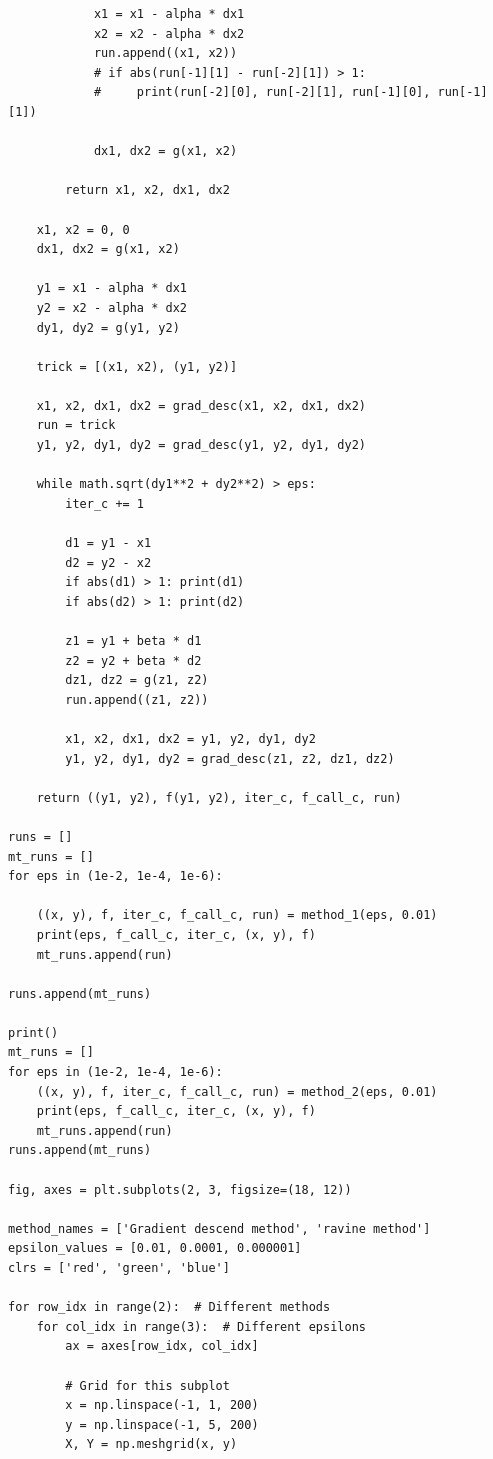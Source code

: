 \documentclass[12pt, letterpaper]{article}
\begin{document}
\begin{lstlisting}
            x1 = x1 - alpha * dx1
            x2 = x2 - alpha * dx2
            run.append((x1, x2))
            # if abs(run[-1][1] - run[-2][1]) > 1: 
            #     print(run[-2][0], run[-2][1], run[-1][0], run[-1][1]) 
            
            dx1, dx2 = g(x1, x2)

        return x1, x2, dx1, dx2

    x1, x2 = 0, 0
    dx1, dx2 = g(x1, x2)

    y1 = x1 - alpha * dx1
    y2 = x2 - alpha * dx2
    dy1, dy2 = g(y1, y2)

    trick = [(x1, x2), (y1, y2)]

    x1, x2, dx1, dx2 = grad_desc(x1, x2, dx1, dx2)
    run = trick
    y1, y2, dy1, dy2 = grad_desc(y1, y2, dy1, dy2)

    while math.sqrt(dy1**2 + dy2**2) > eps:
        iter_c += 1

        d1 = y1 - x1
        d2 = y2 - x2
        if abs(d1) > 1: print(d1)
        if abs(d2) > 1: print(d2)

        z1 = y1 + beta * d1
        z2 = y2 + beta * d2
        dz1, dz2 = g(z1, z2)
        run.append((z1, z2))

        x1, x2, dx1, dx2 = y1, y2, dy1, dy2
        y1, y2, dy1, dy2 = grad_desc(z1, z2, dz1, dz2)
            
    return ((y1, y2), f(y1, y2), iter_c, f_call_c, run)

runs = []
mt_runs = []
for eps in (1e-2, 1e-4, 1e-6):

    ((x, y), f, iter_c, f_call_c, run) = method_1(eps, 0.01)
    print(eps, f_call_c, iter_c, (x, y), f)
    mt_runs.append(run)

runs.append(mt_runs)
    
print()
mt_runs = []
for eps in (1e-2, 1e-4, 1e-6):
    ((x, y), f, iter_c, f_call_c, run) = method_2(eps, 0.01)
    print(eps, f_call_c, iter_c, (x, y), f)
    mt_runs.append(run)
runs.append(mt_runs)

fig, axes = plt.subplots(2, 3, figsize=(18, 12))

method_names = ['Gradient descend method', 'ravine method'] 
epsilon_values = [0.01, 0.0001, 0.000001]
clrs = ['red', 'green', 'blue']

for row_idx in range(2):  # Different methods
    for col_idx in range(3):  # Different epsilons
        ax = axes[row_idx, col_idx]
        
        # Grid for this subplot
        x = np.linspace(-1, 1, 200)
        y = np.linspace(-1, 5, 200)
        X, Y = np.meshgrid(x, y)
        

\end{lstlisting}
\end{document}
